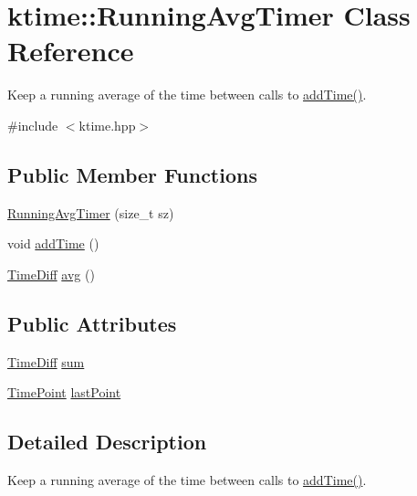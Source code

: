 \hypertarget{classktime_1_1_running_avg_timer}{\section{ktime\-:\-:Running\-Avg\-Timer Class Reference}
\label{classktime_1_1_running_avg_timer}
}


Keep a running average of the time between calls to {\ttfamily \hyperlink{classktime_1_1_running_avg_timer_a1b28c95f0c44346321af8738e35f8025}{add\-Time()}}.  




{\ttfamily \#include $<$ktime.\-hpp$>$}

\subsection*{Public Member Functions}
\begin{DoxyCompactItemize}
\item 
\hyperlink{classktime_1_1_running_avg_timer_acda9a0be9b8d32ef75c4e47b618298a6}{Running\-Avg\-Timer} (size\-\_\-t sz)
\item 
void \hyperlink{classktime_1_1_running_avg_timer_a1b28c95f0c44346321af8738e35f8025}{add\-Time} ()
\item 
\hyperlink{namespacektime_aacefffdcc0ccc2f45598475b3557d6f2}{Time\-Diff} \hyperlink{classktime_1_1_running_avg_timer_ac308f3b5606d61fc5dd8f4350f972b0e}{avg} ()
\end{DoxyCompactItemize}
\subsection*{Public Attributes}
\begin{DoxyCompactItemize}
\item 
\hyperlink{namespacektime_aacefffdcc0ccc2f45598475b3557d6f2}{Time\-Diff} \hyperlink{classktime_1_1_running_avg_timer_a6a22c54aaa6acb0a414f1c276a31ee1c}{sum}
\item 
\hyperlink{namespacektime_a038a3d1fb2cb9885396233d6e412773e}{Time\-Point} \hyperlink{classktime_1_1_running_avg_timer_aebd941b0d88a2ea2a5b9fe48b6466f56}{last\-Point}
\end{DoxyCompactItemize}


\subsection{Detailed Description}
Keep a running average of the time between calls to {\ttfamily \hyperlink{classktime_1_1_running_avg_timer_a1b28c95f0c44346321af8738e35f8025}{add\-Time()}}. 


